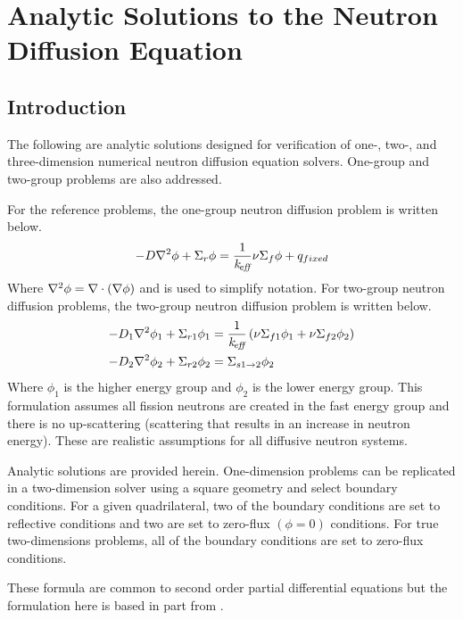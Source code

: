 \chapter{Analytic Solutions to the Neutron Diffusion Equation}
\label{ap:analyticSolutions}

\section{Introduction}
  The following are analytic solutions designed for verification of one-,
  two-, and three-dimension numerical neutron diffusion equation solvers.
  One-group and two-group problems are also addressed.
  
  For the reference problems, the one-group neutron diffusion problem is written
  below.
  \begin{equation} \label{eq:onegroup}
    -D \mathbf{\nabla}^2 \phi + \Sigma_r \phi =  \frac{1}{k_{\!\mbox{\scriptsize \em eff}}} \nu \Sigma_f \phi + 
      q_{fixed}
  \end{equation}
  Where $\mathbf{\nabla}^2 \phi = \mathbf{\nabla} \cdot (\mathbf{\nabla} \phi)$ and is used to simplify 
  notation. For two-group neutron diffusion problems, the two-group neutron 
  diffusion problem is written below.
  \begin{align} 
    \label{eq:twogroup1}
    -D_1 \mathbf{\nabla}^2 \phi_1 + \Sigma_{r1} \phi_1 &= \frac{1}{k_{\!\mbox{\scriptsize \em eff}}} \left(
      \nu \Sigma_{f1} \phi_1 + \nu \Sigma_{f2} \phi_2 \right) \\
    \label{eq:twogroup2}
    -D_2 \mathbf{\nabla}^2 \phi_2 + \Sigma_{r2} \phi_2 &= 
      \Sigma_{s 1 \rightarrow 2} \phi_2
  \end{align}
  Where $\phi_1$ is the higher energy group and $\phi_2$ is the lower energy 
  group. This formulation assumes all fission neutrons are created in the fast 
  energy group and there is no up-scattering (scattering that results in an 
  increase in neutron energy). These are realistic assumptions for all diffusive
  neutron systems.

  Analytic solutions are provided herein. One-dimension problems can be 
  replicated in a two-dimension solver using a square geometry and select 
  boundary conditions. For a given quadrilateral, two of the boundary conditions
  are set to reflective conditions and two are set to zero-flux $(\phi = 0)$ 
  conditions. For true two-dimensions problems, all of the boundary conditions 
  are set to zero-flux conditions.
  
  These formula are common to second order partial differential equations but
  the formulation here is based in part from \cite{textbooklewis}.

